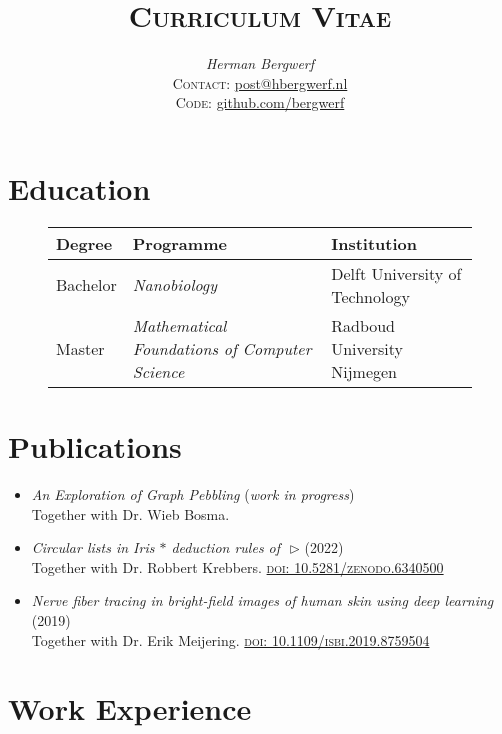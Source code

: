 \documentclass[a4paper,12pt]{article}
\date{}
\title{\textsc{Curriculum Vitae}}
\author{\emph{Herman Bergwerf}\\%
{\small \textsc{Contact:} \href{mailto:post@hbergwerf.nl}{post@hbergwerf.nl}}\\%
{\small \textsc{Code:} \href{https://github.com/bergwerf}{github.com/bergwerf}}}
\begin{document}
\maketitle

\section*{Education}

\begin{figure}[h]
\centering
\begin{tabular}{lll}
\toprule
{\bf Degree} & {\bf Programme} & {\bf Institution}\\
\midrule
Bachelor & \emph{Nanobiology} & Delft University of Technology\\
Master & \emph{Mathematical Foundations of Computer Science} & Radboud University Nijmegen\\
\bottomrule
\end{tabular}
\end{figure}

\section*{Publications}

\begin{itemize}[--,labelsep=3mm,leftmargin=*]
\item \emph{An Exploration of Graph Pebbling} (\emph{work in progress})\\
Together with Dr. Wieb Bosma.
\item \emph{Circular lists in Iris $\ast$ deduction rules of~\,$\triangleright$} (2022)\\
Together with Dr. Robbert Krebbers. \textsc{\href{https://doi.org/10.5281/zenodo.6340500}{doi: 10.5281/zenodo.6340500}}
\item \emph{Nerve fiber tracing in bright-field images of human skin using deep learning} (2019)\\
Together with Dr. Erik Meijering. \textsc{\href{https://ieeexplore.ieee.org/document/8759504}{doi: 10.1109/isbi.2019.8759504}}
\end{itemize}

\section*{Work Experience}
\end{document}
